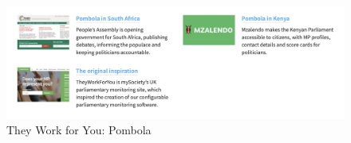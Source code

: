 \begin{figure}[h]
  \centering
  \includegraphics[scale=0.3]{images/they-work-for-you-implementation-open-source-pombola}
  \caption{They Work for You: Pombola}
  \label{fig:they-work-for-you-implementation-open-source-pombola}
\end{figure}